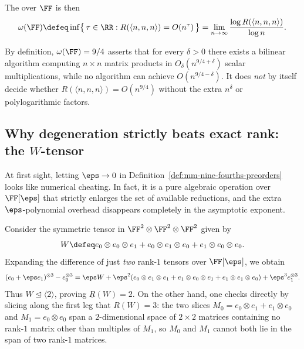 The  over \(\FF\) is then
\begin{equation}
  \omega(\FF) \defeq \inf \bigl\{\, \tau \in \RR : R(\langle n, n, n \rangle) = O(n^\tau) \,\bigr\}
  = \lim_{n \to \infty} \frac{\log R(\langle n, n, n \rangle)}{\log n}.
  \label{eq:mm-nine-fourths-omega-def}
\end{equation}

\begin{caution}[title={Infimum versus minimum}]
By definition, \(\omega(\FF) = 9/4\) asserts that for every \(\delta > 0\) there exists a bilinear algorithm computing \(n \times n\) matrix products in \(O_\delta(n^{9/4 + \delta})\) scalar multiplications, while no algorithm can achieve \(O(n^{9/4 - \delta})\). It does \emph{not} by itself decide whether \(R(\langle n,n,n\rangle) = O(n^{9/4})\) without the extra \(n^\delta\) or polylogarithmic factors.
\end{caution}

\subsection{Why degeneration strictly beats exact rank: the \(W\)-tensor}

At first sight, letting \(\eps \to 0\) in Definition~\ref{def:mm-nine-fourths-preorders} looks like numerical cheating. In fact, it is a pure algebraic operation over \(\FF[\eps]\) that strictly enlarges the set of available reductions, and the extra \(\eps\)-polynomial overhead disappears completely in the asymptotic exponent.

\begin{example}
\label{ex:mm-nine-fourths-W-tensor}
Consider the symmetric tensor in \(\FF^2 \otimes \FF^2 \otimes \FF^2\) given by
\[
  W \defeq e_0 \otimes e_0 \otimes e_1 + e_0 \otimes e_1 \otimes e_0 + e_1 \otimes e_0 \otimes e_0.
\]
Expanding the difference of just \emph{two} rank-\(1\) tensors over \(\FF[\eps]\), we obtain
\[
  (e_0 + \eps e_1)^{\otimes 3} - e_0^{\otimes 3}
  = \eps W + \eps^2 (e_0 \otimes e_1 \otimes e_1 + e_1 \otimes e_0 \otimes e_1 + e_1 \otimes e_1 \otimes e_0) + \eps^3 e_1^{\otimes 3}.
\]
Thus \(W \trianglelefteq \langle 2 \rangle\), proving \(\underline{R}(W) = 2\). On the other hand, one checks directly by slicing along the first leg that \(R(W) = 3\): the two slices \(M_0 = e_0 \otimes e_1 + e_1 \otimes e_0\) and \(M_1 = e_0 \otimes e_0\) span a \(2\)-dimensional space of \(2 \times 2\) matrices containing no rank-\(1\) matrix other than multiples of \(M_1\), so \(M_0\) and \(M_1\) cannot both lie in the span of two rank-\(1\) matrices.
\end{example}

